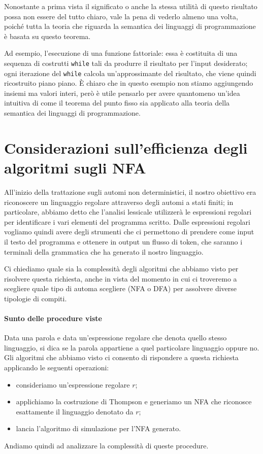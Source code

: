 \documentclass[class=book, crop=false, oneside, 12pt]{standalone}
\begin{document}
Nonostante a prima vista il significato o anche la stessa utilità di questo risultato possa non essere del tutto chiaro, vale la pena di vederlo almeno una volta, poiché tutta la teoria che riguarda la semantica dei linguaggi di programmazione è basata su questo teorema. 

Ad esempio, l'esecuzione di una funzione fattoriale: essa è costituita di una sequenza di costrutti \texttt{while} tali da produrre il risultato per l'input desiderato; ogni iterazione del \texttt{while} calcola un'approssimante del risultato, che viene quindi ricostruito piano piano. È chiaro che in questo esempio non stiamo aggiungendo insiemi ma valori interi, però è utile pensarlo per avere quantomeno un'idea intuitiva di come il teorema del punto fisso sia applicato alla teoria della semantica dei linguaggi di programmazione.

\section{Considerazioni sull'efficienza degli algoritmi sugli NFA}
All'inizio della trattazione sugli automi non deterministici, il nostro obiettivo era riconoscere un linguaggio regolare attraverso degli automi a stati finiti; in particolare, abbiamo detto che l'analisi lessicale utilizzerà le espressioni regolari per identificare i vari elementi del programma scritto. Dalle espressioni regolari vogliamo quindi avere degli strumenti che ci permettono di prendere come input il testo del programma e ottenere in output un flusso di token, che saranno i terminali della grammatica che ha generato il nostro linguaggio.

Ci chiediamo quale sia la complessità degli algoritmi che abbiamo visto per risolvere questa richiesta, anche in vista del momento in cui ci troveremo a scegliere quale tipo di automa scegliere (NFA o DFA) per assolvere diverse tipologie di compiti.

\paragraph{Sunto delle procedure viste}
Data una parola e data un'espressione regolare che denota quello stesso linguaggio, si dica se la parola appartiene a quel particolare linguaggio oppure no. Gli algoritmi che abbiamo visto ci consento di rispondere a questa richiesta applicando le seguenti operazioni:
\begin{itemize}
    \item consideriamo un'espressione regolare \(r\);
    \item applichiamo la costruzione di Thompson e generiamo un NFA che riconosce esattamente il linguaggio denotato da \(r\);
    \item lancia l'algoritmo di simulazione per l'NFA generato.
\end{itemize}
Andiamo quindi ad analizzare la complessità di queste procedure.
\end{document}
